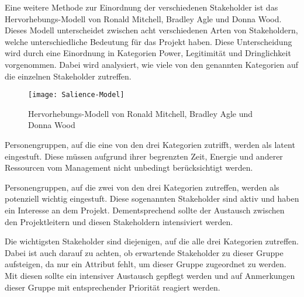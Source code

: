Eine weitere Methode zur Einordnung der verschiedenen Stakeholder ist das Hervorhebungs-Modell von Ronald Mitchell, Bradley Agle und Donna Wood.
Dieses Modell unterscheidet zwischen acht verschiedenen Arten von Stakeholdern, welche unterschiedliche Bedeutung für das Projekt haben.
Diese Unterscheidung wird durch eine Einordnung in Kategorien Power, Legitimität und Dringlichkeit vorgenommen.
Dabei wird analysiert, wie viele von den genannten Kategorien auf die einzelnen Stakeholder zutreffen.

\begin{figure}[ht]
    \centering
    \texttt{[image: Salience-Model]}
    \caption{Hervorhebungs-Modell von Ronald Mitchell, Bradley Agle und Donna Wood\autocite[S. 874]{Mitchell.1997}}
    \label{fig:highlight-model}
\end{figure}

Personengruppen, auf die eine von den drei Kategorien zutrifft, werden als latent eingestuft.
Diese müssen aufgrund ihrer begrenzten Zeit, Energie und anderer Ressourcen vom Management nicht unbedingt berücksichtigt werden.

Personengruppen, auf die zwei von den drei Kategorien zutreffen, werden als potenziell wichtig eingestuft.
Diese sogenannten  Stakeholder sind aktiv und haben ein Interesse an dem Projekt.
Dementsprechend sollte der Austausch zwischen den Projektleitern und diesen Stakeholdern intensiviert werden.

Die wichtigsten Stakeholder sind diejenigen, auf die alle drei Kategorien zutreffen.
Dabei ist auch darauf zu achten, ob erwartende Stakeholder zu dieser Gruppe aufsteigen, da nur ein Attribut fehlt, um dieser Gruppe zugeordnet zu werden.
Mit diesen sollte ein intensiver Austausch gepflegt werden und auf Anmerkungen dieser Gruppe mit entsprechender Priorität reagiert werden\autocite[vgl.][S. 874ff]{Mitchell.1997}.

